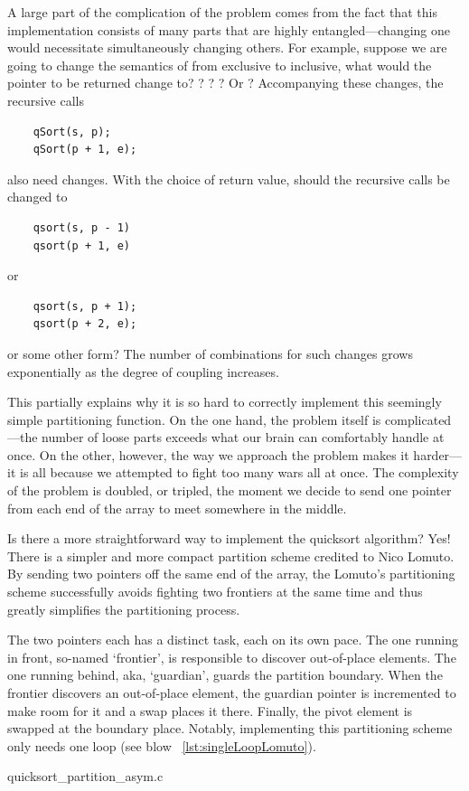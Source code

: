 A large part of the complication of the problem comes from the fact that this implementation
consists of many parts that are highly entangled---changing one would necessitate simultaneously
changing others.
For example,
suppose we are going to change the semantics of  from exclusive to inclusive, what
would the pointer to be returned change to?
? ? ? Or ?
Accompanying these changes, the recursive calls
\begin{lstlisting}
    qSort(s, p);
    qSort(p + 1, e);
\end{lstlisting}
also need changes.
With the choice of return value, should the recursive calls be changed to
\begin{lstlisting}
    qsort(s, p - 1)
    qsort(p + 1, e)
\end{lstlisting}
or
\begin{lstlisting}
    qsort(s, p + 1);
    qsort(p + 2, e);
\end{lstlisting}
or some other form?
The number of combinations for such changes grows exponentially as the degree of coupling increases.


This partially explains why it is so hard to correctly implement this seemingly simple partitioning
function.
On the one hand, the problem itself is complicated---the number of loose parts exceeds what our
brain can comfortably handle at once.
On the other, however, the way we approach the problem makes it harder---it is all because
we attempted to fight too many wars all at once.
The complexity of the problem is doubled, or tripled, the moment we decide to send one pointer
from each end of the array to meet somewhere in the middle.


Is there a more straightforward way to implement the quicksort algorithm?
Yes!
There is a simpler and more compact partition scheme credited to Nico Lomuto\cite{Bentley:1986:PP}.
By sending two pointers off the same end of the array, the Lomuto's partitioning scheme
successfully avoids fighting two frontiers at the same time and thus greatly simplifies the
partitioning process.


The two pointers each has a distinct task, each on its own pace.
The one running in front, so-named `frontier', is responsible to discover out-of-place elements.
The one running behind, aka, `guardian', guards the partition boundary.
When the frontier discovers an out-of-place element, the guardian pointer is incremented to make
room for it and a swap places it there.
Finally, the pivot element is swapped at the boundary place.
Notably, implementing this partitioning scheme only needs one loop
(see blow ~\autoref{lst:singleLoopLomuto}).

{quicksort_partition_asym.c}


